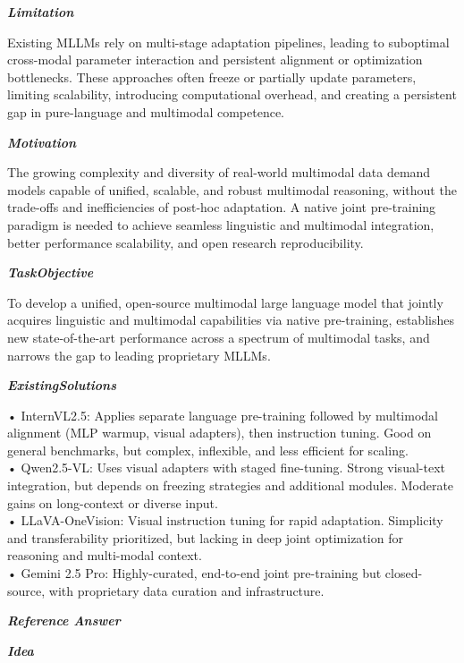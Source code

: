 \begin{tcolorbox}[
    breakable,
    title={Example of Idea Generation in Information},
    colback=LighterGray,
    colframe=DeepPurple,
    colbacktitle=DeepPurple,
    coltitle=White,
]
\textbf{\emph{\textcolor{CaseOrange}{Limitation}}}

Existing MLLMs rely on multi-stage adaptation pipelines, leading to suboptimal cross-modal parameter
interaction and persistent alignment or optimization bottlenecks. These approaches often freeze or
partially update parameters, limiting scalability, introducing computational overhead, and creating
a persistent gap in pure-language and multimodal competence.

\textbf{\emph{\textcolor{CaseOrange}{Motivation}}}

The growing complexity and diversity of real-world multimodal data demand models capable of unified,
scalable, and robust multimodal reasoning, without the trade-offs and inefficiencies of post-hoc
adaptation. A native joint pre-training paradigm is needed to achieve seamless linguistic and
multimodal integration, better performance scalability, and open research reproducibility.

\textbf{\emph{\textcolor{CaseOrange}{TaskObjective}}}

To develop a unified, open-source multimodal large language model that jointly acquires linguistic
and multimodal capabilities via native pre-training, establishes new state-of-the-art performance
across a spectrum of multimodal tasks, and narrows the gap to leading proprietary MLLMs.

\textbf{\emph{\textcolor{CaseOrange}{ExistingSolutions}}}

• InternVL2.5: Applies separate language pre-training followed by multimodal alignment (MLP warmup, visual adapters), then instruction tuning. Good on general benchmarks, but complex, inflexible, and less efficient for scaling. \\
• Qwen2.5-VL: Uses visual adapters with staged fine-tuning. Strong visual-text integration, but depends on freezing strategies and additional modules. Moderate gains on long-context or diverse input. \\
• LLaVA-OneVision: Visual instruction tuning for rapid adaptation. Simplicity and transferability prioritized, but lacking in deep joint optimization for reasoning and multi-modal context. \\
• Gemini 2.5 Pro: Highly-curated, end-to-end joint pre-training but closed-source, with proprietary data curation and infrastructure. 

\textbf{\emph{\textcolor{DeepPurple}{Reference Answer}}}

\textbf{\emph{\textcolor{CaseOrange}{Idea}}}


\end{tcolorbox}
